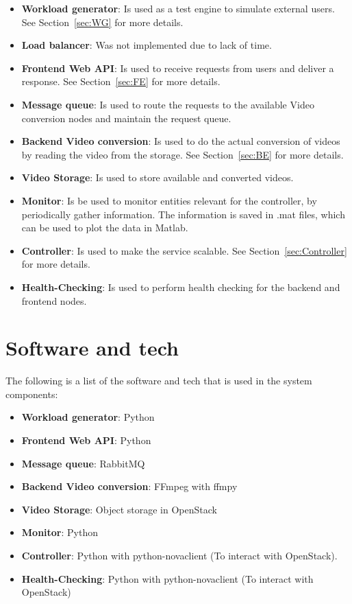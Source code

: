 \documentclass[a4paper, 10pt, english]{article}
\begin{document}
\begin{itemize}
	\item \textbf{Workload generator}: Is used as a test engine to simulate external users. See Section~\ref{sec:WG} for more details.
	\item \textbf{Load balancer}: Was not implemented due to lack of time.
	\item \textbf{Frontend Web API}: Is used to receive requests from users and deliver a response. See Section~\ref{sec:FE} for more details.
	\item \textbf{Message queue}: Is used to route the requests to the available Video conversion nodes and maintain the request queue. 
	\item \textbf{Backend Video conversion}: Is used to do the actual conversion of videos by reading the video from the storage. See Section~\ref{sec:BE} for more details.
	\item \textbf{Video Storage}: Is used to store available and converted videos.
	\item \textbf{Monitor}: Is be used to monitor entities relevant for the controller, by periodically gather information. The information is saved in .mat files, which can be used to plot the data in Matlab.
	\item \textbf{Controller}: Is used to make the service scalable. See Section~\ref{sec:Controller} for more details.
	\item \textbf{Health-Checking}: Is used to perform health checking for the backend and frontend nodes.
\end{itemize}

\section{Software and tech}
The following is a list of the software and tech that is used in the system components:
\begin{itemize}
	\item \textbf{Workload generator}: Python
	\item \textbf{Frontend Web API}: Python
	\item \textbf{Message queue}: RabbitMQ
	\item \textbf{Backend Video conversion}: FFmpeg with ffmpy
	\item \textbf{Video Storage}: Object storage in OpenStack
	\item \textbf{Monitor}: Python
	\item \textbf{Controller}: Python with python-novaclient (To interact with OpenStack).
	\item \textbf{Health-Checking}: Python with python-novaclient (To interact with OpenStack)
\end{itemize}
\end{document}
